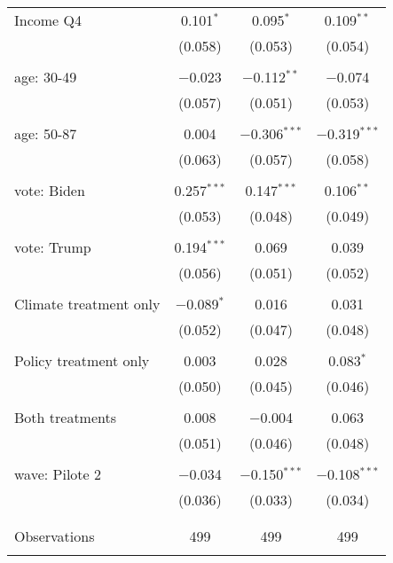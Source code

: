 \begin{tabular}{@{\extracolsep{5pt}}lccc}
 Income Q4 & 0.101$^{*}$ & 0.095$^{*}$ & 0.109$^{**}$ \\ 
  & (0.058) & (0.053) & (0.054) \\ 
  & & & \\ 
 age: 30-49 & $-$0.023 & $-$0.112$^{**}$ & $-$0.074 \\ 
  & (0.057) & (0.051) & (0.053) \\ 
  & & & \\ 
 age: 50-87 & 0.004 & $-$0.306$^{***}$ & $-$0.319$^{***}$ \\ 
  & (0.063) & (0.057) & (0.058) \\ 
  & & & \\ 
 vote: Biden & 0.257$^{***}$ & 0.147$^{***}$ & 0.106$^{**}$ \\ 
  & (0.053) & (0.048) & (0.049) \\ 
  & & & \\ 
 vote: Trump & 0.194$^{***}$ & 0.069 & 0.039 \\ 
  & (0.056) & (0.051) & (0.052) \\ 
  & & & \\ 
 Climate treatment only & $-$0.089$^{*}$ & 0.016 & 0.031 \\ 
  & (0.052) & (0.047) & (0.048) \\ 
  & & & \\ 
 Policy treatment only & 0.003 & 0.028 & 0.083$^{*}$ \\ 
  & (0.050) & (0.045) & (0.046) \\ 
  & & & \\ 
 Both treatments & 0.008 & $-$0.004 & 0.063 \\ 
  & (0.051) & (0.046) & (0.048) \\ 
  & & & \\ 
 wave: Pilote 2 & $-$0.034 & $-$0.150$^{***}$ & $-$0.108$^{***}$ \\ 
  & (0.036) & (0.033) & (0.034) \\ 
  & & & \\ 
\hline \\[-1.8ex] 

Observations & 499 & 499 & 499 \\ 
\hline 
\hline \\[-1.8ex] 
\end{tabular} 